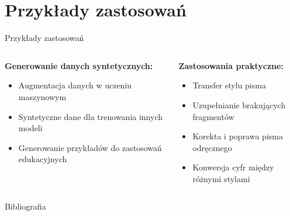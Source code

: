 \documentclass{beamer}
\begin{document}
\section{Przykłady zastosowań}

\begin{frame}{Przykłady zastosowań}
  \begin{columns}
    \begin{column}{0.5\textwidth}
      \textbf{Generowanie danych syntetycznych:}
      \begin{itemize}
        \item Augmentacja danych w uczeniu maszynowym
        \item Syntetyczne dane dla trenowania innych modeli
        \item Generowanie przykładów do zastosowań edukacyjnych
      \end{itemize}
    \end{column}
    \begin{column}{0.5\textwidth}
      \textbf{Zastosowania praktyczne:}
      \begin{itemize}
        \item Transfer stylu pisma
        \item Uzupełnianie brakujących fragmentów
        \item Korekta i poprawa pisma odręcznego
        \item Konwersja cyfr między różnymi stylami
      \end{itemize}
    \end{column}
  \end{columns}
\end{frame}


\begin{frame}[allowframebreaks]{Bibliografia}
  \printbibliography
\end{frame}
\end{document}
